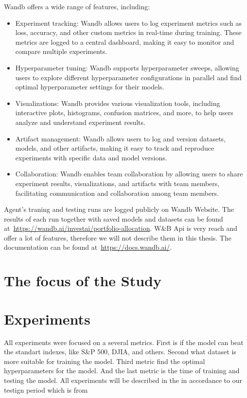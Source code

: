 \documentclass[../xlapes02]{subfiles}
\begin{document}
    Wandb offers a wide range of features, including:
    \begin{itemize}
        \item Experiment tracking: Wandb allows users to log experiment metrics such as loss, accuracy, and other custom metrics in real-time during training. These metrics are logged to a central dashboard, making it easy to monitor and compare multiple experiments.
        \item Hyperparameter tuning: Wandb supports hyperparameter sweeps, allowing users to explore different hyperparameter configurations in parallel and find optimal hyperparameter settings for their models.
        \item Visualizations: Wandb provides various visualization tools, including interactive plots, histograms, confusion matrices, and more, to help users analyze and understand experiment results.
        \item Artifact management: Wandb allows users to log and version datasets, models, and other artifacts, making it easy to track and reproduce experiments with specific data and model versions.
        \item Collaboration: Wandb enables team collaboration by allowing users to share experiment results, visualizations, and artifacts with team members, facilitating communication and collaboration among team members.
    \end{itemize}

    Agent's traning and testing runs are logged publicly on Wandb Website. The results of each run together with saved models and datasets can be found at~\url{https://wandb.ai/investai/portfolio-allocation}.
    W\&B Api is very reach and offer a lot of features, therefore we will not describe them in this thesis. The documentation can be found at~\url{https://docs.wandb.ai/}.


    \section{The focus of the Study}\label{sec:the-focus-of-the-study}


    \section{Experiments}\label{sec:metrics-comparison}
    All experiments were focused on a several metrics. First is if the model can beat the standart indexes, like S\&P 500, DJIA, and others. Second what dataset is more suitable for training the model. Third metric find the optimal hyperparameters for the model. And the last metric is the time of training and testing the model. All experiments will be described in the in accordance to our testign period which is from
\end{document}
